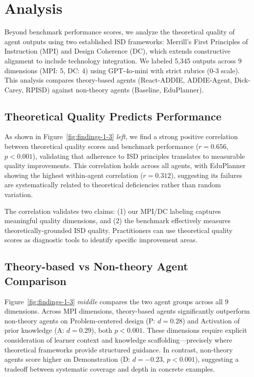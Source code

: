 \section{Analysis}
\label{sec:analysis}

Beyond benchmark performance scores, we analyze the theoretical quality of agent outputs using two established ISD frameworks: Merrill's First Principles of Instruction \cite{merrill2002first} (MPI) and Design Coherence (DC), which extends constructive alignment \cite{biggs1996enhancing} to include technology integration. We labeled 5,345 outputs across 9 dimensions (MPI: 5, DC: 4) using GPT-4o-mini with strict rubrics (0-3 scale). This analysis compares theory-based agents (React-ADDIE, ADDIE-Agent, Dick-Carey, RPISD) against non-theory agents (Baseline, EduPlanner).

\subsection{Theoretical Quality Predicts Performance}

As shown in Figure~\ref{fig:findings-1-3} \textit{left}, we find a strong positive correlation between theoretical quality scores and benchmark performance ($r = 0.656$, $p < 0.001$), validating that adherence to ISD principles translates to measurable quality improvements. This correlation holds across all agents, with EduPlanner showing the highest within-agent correlation ($r = 0.312$), suggesting its failures are systematically related to theoretical deficiencies rather than random variation.

The correlation validates two claims: (1) our MPI/DC labeling captures meaningful quality dimensions, and (2) the benchmark effectively measures theoretically-grounded ISD quality. Practitioners can use theoretical quality scores as diagnostic tools to identify specific improvement areas.

\subsection{Theory-based vs Non-theory Agent Comparison}

Figure~\ref{fig:findings-1-3} \textit{middle} compares the two agent groups across all 9 dimensions. Across MPI dimensions, theory-based agents significantly outperform non-theory agents on Problem-centered design (P: $d = 0.28$) and Activation of prior knowledge (A: $d = 0.29$), both $p < 0.001$. These dimensions require explicit consideration of learner context and knowledge scaffolding---precisely where theoretical frameworks provide structured guidance. In contrast, non-theory agents score higher on Demonstration (D: $d = -0.23$, $p < 0.001$), suggesting a tradeoff between systematic coverage and depth in concrete examples.

